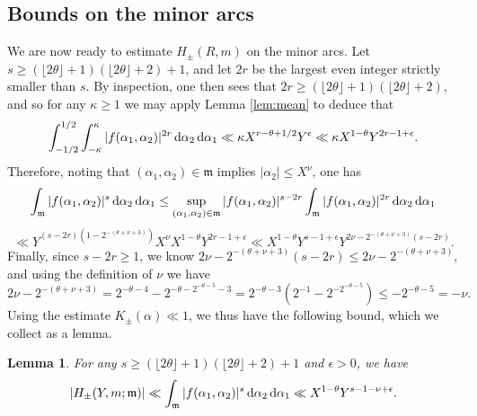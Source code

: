 \documentclass[11pt,reqno]{amsart}
\numberwithin{equation}{section}
\newtheorem{lemma}{Lemma}[section]
\renewcommand{\d}{\,{\rm d}}
\begin{document}
\subsection{Bounds on the minor arcs}
We are now ready to estimate $H_{\pm}(R,m)$ on the minor arcs. Let $s \geq (\lfloor 2\theta \rfloor+1)(\lfloor 2\theta \rfloor+2)+1$, and let $2r$ be the largest even integer strictly smaller than $s$. By inspection, one then sees that $2r \geq (\lfloor 2\theta \rfloor+1)(\lfloor 2\theta \rfloor+2)$, and so for any $\kappa \geq 1$ we may apply Lemma \ref{lem:mean} to deduce that
\[ \int_{-1/2}^{1/2} \int_{-\kappa}^{\kappa} |f(\alpha_1,\alpha_2)|^{2r}\d\alpha_2\d\alpha_1 \ll \kappa X^{r-\theta+1/2}Y^{\epsilon} \ll \kappa X^{1-\theta} Y^{2r-1+\epsilon}. \]
Therefore, noting that $(\alpha_1,\alpha_2) \in \mathfrak{m}$ implies $|\alpha_2| \leq X^{\nu}$, one has 
\[ \int_{\mathfrak{m}} |f(\alpha_1,\alpha_2)|^{s}\d\alpha_2\d\alpha_1 \leq \sup_{(\alpha_1,\alpha_2) \in \mathfrak{m} } |f(\alpha_1,\alpha_2)|^{s-2r} \int_{\mathfrak{m}} |f(\alpha_1,\alpha_2)|^{2r}\d\alpha_2\d\alpha_1 \] 
\[\ll Y^{(s-2r)(1-2^{-(\theta+\nu+3)})} X^{\nu}X^{1-\theta}Y^{2r-1+\epsilon} \ll X^{1-\theta}Y^{s-1+\epsilon}Y^{2\nu-2^{-(\theta+\nu+3)}(s-2r)}. \]
Finally, since $s-2r \geq 1$, we know $2\nu-2^{-(\theta+\nu+3)}(s-2r) \leq 2\nu - 2^{-(\theta+\nu+3)}$, and using the definition of $\nu$ we have 
\[ 2\nu - 2^{-(\theta+\nu+3)} = 2^{-\theta-4}-2^{-\theta- 2^{-\theta-5} -3} = 2^{-\theta-3}(2^{-1}-2^{-2^{-\theta-5}}) \leq -2^{-\theta-5} = -\nu.  \]
Using the estimate $K_{\pm}(\alpha) \ll 1$, we thus have the following bound, which we collect as a lemma. 
\begin{lemma} \label{lem:minor} 
For any $s \geq (\lfloor 2\theta \rfloor+1)(\lfloor 2\theta \rfloor+2)+1$ and $\epsilon > 0$, we have 
\[ |H_{\pm}(Y,m; \mathfrak{m})| 
\ll \int_{\mathfrak{m}} |f(\alpha_1,\alpha_2)|^{s}\d\alpha_2\d\alpha_1 \ll X^{1-\theta}Y^{s-1-\nu+\epsilon}. \]
\end{lemma}
\end{document}

